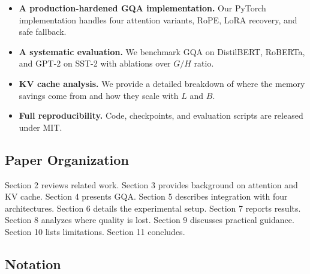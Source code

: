 \begin{itemize}
\item \textbf{A production-hardened GQA implementation.} Our PyTorch implementation
  handles four attention variants, RoPE, LoRA recovery, and safe fallback.
\item \textbf{A systematic evaluation.} We benchmark GQA on DistilBERT, RoBERTa, and
  GPT-2 on SST-2 with ablations over $G / H$ ratio.
\item \textbf{KV cache analysis.} We provide a detailed breakdown of where the memory
  savings come from and how they scale with $L$ and $B$.
\item \textbf{Full reproducibility.} Code, checkpoints, and evaluation scripts are
  released under MIT.

\end{itemize}
\subsection{Paper Organization}

Section 2 reviews related work. Section 3 provides background on attention 
and KV cache. Section 4 presents GQA. Section 5 describes integration with 
four architectures. Section 6 details the experimental setup. Section 7 
reports results. Section 8 analyzes where quality is lost. Section 9 
discusses practical guidance. Section 10 lists limitations. Section 11 
concludes.



\subsection{Notation}
